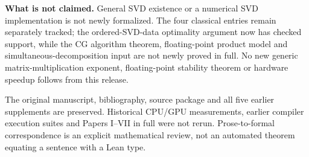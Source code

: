 \documentclass[11pt]{article}
\begin{document}
\textbf{What is not claimed.} General SVD existence or a numerical SVD implementation is not newly formalized. The four classical entries remain separately tracked; the ordered-SVD-data optimality argument now has checked support, while the CG algorithm theorem, floating-point product model and simultaneous-decomposition input are not newly proved in full. No new generic matrix-multiplication exponent, floating-point stability theorem or hardware speedup follows from this release.

The original manuscript, bibliography, source package and all five earlier supplements are preserved. Historical CPU/GPU measurements, earlier compiler execution suites and Papers I--VII in full were not rerun. Prose-to-formal correspondence is an explicit mathematical review, not an automated theorem equating a sentence with a Lean type.
\end{document}
